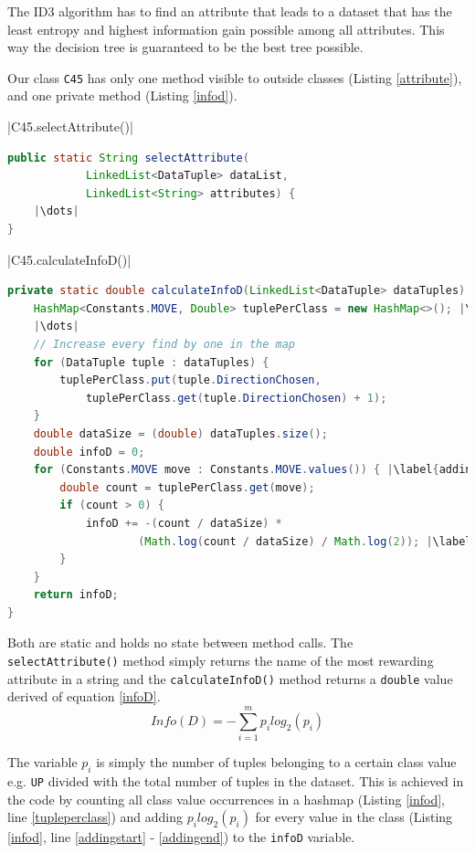\documentclass{article}
\begin{document}
    The ID3 algorithm has to find an attribute that leads to a dataset that has the least entropy and highest information gain possible among all attributes. This way the decision tree is guaranteed to be the best tree possible.

    Our class \verb|C45| has only one method visible to outside classes (Listing \ref{attribute}), and one private method (Listing \ref{infod}).

    |C45.selectAttribute()|
    \begin{lstlisting}[language=Java, caption=Method declaration of \protect\UseVerb{term}, label={attribute}, escapechar=|]
public static String selectAttribute(
            LinkedList<DataTuple> dataList,
            LinkedList<String> attributes) {
    |\dots|
}
    \end{lstlisting}

    |C45.calculateInfoD()|
    \begin{lstlisting}[language=Java, caption=Method definition of \protect\UseVerb{term2}, label={infod}, escapechar=|]
private static double calculateInfoD(LinkedList<DataTuple> dataTuples) {
    HashMap<Constants.MOVE, Double> tuplePerClass = new HashMap<>(); |\label{tupleperclass}|
    |\dots|
    // Increase every find by one in the map
    for (DataTuple tuple : dataTuples) {
        tuplePerClass.put(tuple.DirectionChosen,
            tuplePerClass.get(tuple.DirectionChosen) + 1);
    }
    double dataSize = (double) dataTuples.size();
    double infoD = 0;
    for (Constants.MOVE move : Constants.MOVE.values()) { |\label{addingstart}|
        double count = tuplePerClass.get(move);
        if (count > 0) {
            infoD += -(count / dataSize) *
                    (Math.log(count / dataSize) / Math.log(2)); |\label{addingend}|
        }
    }
    return infoD;
}\end{lstlisting}

    Both are static and holds no state between method calls. The \verb|selectAttribute()| method simply returns the name of the most rewarding attribute in a string and the \verb|calculateInfoD()| method returns a \verb|double| value derived of equation \ref{infoD}.
    \begin{equation} \label{infoD}
    Info(D)=-\sum_{i=1}^{m}p_i log_2(p_i)
    \end{equation}

    The variable $p_i$ is simply the number of tuples belonging to a certain class value e.g. \verb|UP| divided with the total number of tuples in the dataset. This is achieved in the code by counting all class value occurrences in a hashmap (Listing \ref{infod}, line \ref{tupleperclass}) and adding $p_i log_2(p_i)$ for every value in the class (Listing \ref{infod}, line \ref{addingstart} - \ref{addingend}) to the \verb|infoD| variable.
\end{document}
